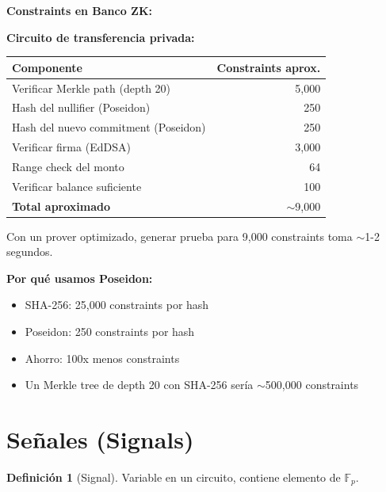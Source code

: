 \documentclass[11pt,a4paper,twoside,openright]{book}
\theoremstyle{definition}
\newtheorem{definition}{Definición}[chapter]
\theoremstyle{plain}
\theoremstyle{remark}
\begin{document}
\begin{bancozk}
\textbf{Constraints en Banco ZK:}

\textbf{Circuito de transferencia privada:}

\begin{center}
\begin{tabular}{lr}
\toprule
\textbf{Componente} & \textbf{Constraints aprox.} \\
\midrule
Verificar Merkle path (depth 20) & 5,000 \\
Hash del nullifier (Poseidon) & 250 \\
Hash del nuevo commitment (Poseidon) & 250 \\
Verificar firma (EdDSA) & 3,000 \\
Range check del monto & 64 \\
Verificar balance suficiente & 100 \\
\midrule
\textbf{Total aproximado} & $\sim$9,000 \\
\bottomrule
\end{tabular}
\end{center}

Con un prover optimizado, generar prueba para 9,000 constraints toma $\sim$1-2 segundos.

\textbf{Por qué usamos Poseidon:}
\begin{itemize}
    \item SHA-256: 25,000 constraints por hash
    \item Poseidon: 250 constraints por hash
    \item Ahorro: 100x menos constraints
    \item Un Merkle tree de depth 20 con SHA-256 sería $\sim$500,000 constraints
\end{itemize}
\end{bancozk}


\section{Señales (Signals)}

\begin{definition}[Signal]
Variable en un circuito, contiene elemento de $\mathbb{F}_p$.
\end{definition}
\end{document}
